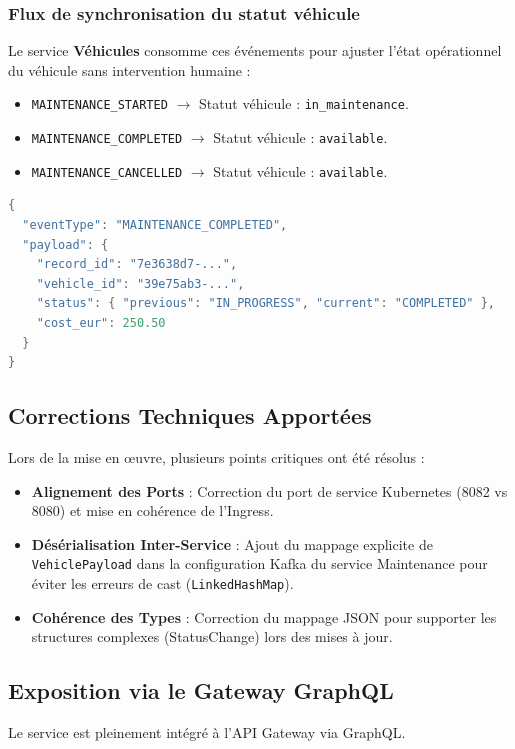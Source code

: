 \documentclass[12pt,a4paper]{article}
\begin{document}
\subsubsection{Flux de synchronisation du statut véhicule}
Le service \textbf{Véhicules} consomme ces événements pour ajuster l'état opérationnel du véhicule sans intervention humaine :
\begin{itemize}
    \item \texttt{MAINTENANCE\_STARTED} $\rightarrow$ Statut véhicule : \texttt{in\_maintenance}.
    \item \texttt{MAINTENANCE\_COMPLETED} $\rightarrow$ Statut véhicule : \texttt{available}.
    \item \texttt{MAINTENANCE\_CANCELLED} $\rightarrow$ Statut véhicule : \texttt{available}.
\end{itemize}

\begin{lstlisting}[language=Java, caption=Exemple d'enveloppe d'événement Kafka]
{
  "eventType": "MAINTENANCE_COMPLETED",
  "payload": {
    "record_id": "7e3638d7-...",
    "vehicle_id": "39e75ab3-...",
    "status": { "previous": "IN_PROGRESS", "current": "COMPLETED" },
    "cost_eur": 250.50
  }
}
\end{lstlisting}

\subsection{Corrections Techniques Apportées}
Lors de la mise en \oe{}uvre, plusieurs points critiques ont été résolus :
\begin{itemize}
    \item \textbf{Alignement des Ports} : Correction du port de service Kubernetes (8082 vs 8080) et mise en cohérence de l'Ingress.
    \item \textbf{Désérialisation Inter-Service} : Ajout du mappage explicite de \texttt{VehiclePayload} dans la configuration Kafka du service Maintenance pour éviter les erreurs de cast (\texttt{LinkedHashMap}).
    \item \textbf{Cohérence des Types} : Correction du mappage JSON pour supporter les structures complexes (StatusChange) lors des mises à jour.
\end{itemize}

\subsection{Exposition via le Gateway GraphQL}
Le service est pleinement intégré à l'API Gateway via GraphQL.
\end{document}
